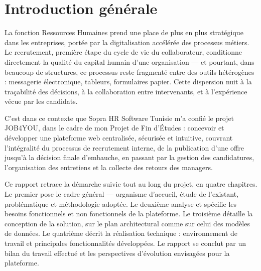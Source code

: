\chapter*{Introduction générale}
\adjustmtc

La fonction Ressources Humaines prend une place de plus en plus stratégique dans les entreprises, portée par la digitalisation accélérée des processus métiers. Le recrutement, première étape du cycle de vie du collaborateur, conditionne directement la qualité du capital humain d’une organisation — et pourtant, dans beaucoup de structures, ce processus reste fragmenté entre des outils hétérogènes : messagerie électronique, tableurs, formulaires papier. Cette dispersion nuit à la traçabilité des décisions, à la collaboration entre intervenants, et à l’expérience vécue par les candidats.

C’est dans ce contexte que Sopra HR Software Tunisie m’a confié le projet JOB4YOU, dans le cadre de mon Projet de Fin d’Études : concevoir et développer une plateforme web centralisée, sécurisée et intuitive, couvrant l’intégralité du processus de recrutement interne, de la publication d’une offre jusqu’à la décision finale d’embauche, en passant par la gestion des candidatures, l’organisation des entretiens et la collecte des retours des managers.

Ce rapport retrace la démarche suivie tout au long du projet, en quatre chapitres. Le premier pose le cadre général — organisme d’accueil, étude de l’existant, problématique et méthodologie adoptée. Le deuxième analyse et spécifie les besoins fonctionnels et non fonctionnels de la plateforme. Le troisième détaille la conception de la solution, sur le plan architectural comme sur celui des modèles de données. Le quatrième décrit la réalisation technique : environnement de travail et principales fonctionnalités développées. Le rapport se conclut par un bilan du travail effectué et les perspectives d’évolution envisagées pour la plateforme.
